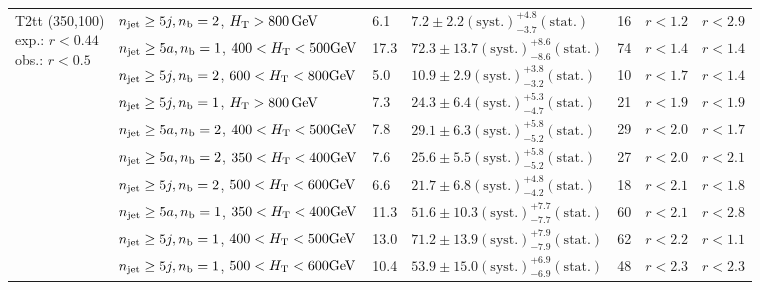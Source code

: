 \begin{table}[h!]
\begin{tabular}{ lllllll }
\multirow{10}{*}{\parbox[t]{2cm}{T2tt (350,100)\\exp.: $r<0.44$\\obs.: $r<0.5$}}
 & $n_{\mathrm{jet}} \geq5j,n_{\text{b}} =2$, $\mbox{$H_\text{T}$} > 800 \, \mathrm{GeV}$ & 6.1 & $7.2 \pm 2.2 \mathrm{(syst.)} ^{+4.8}_{-3.7} \mathrm{(stat.)}$ & 16 & $r < 1.2$ & $r < 2.9$\\ 
 & $n_{\mathrm{jet}} \geq5a,n_{\text{b}} =1$, $400 < \mbox{$H_\text{T}$} < 500 \mathrm{GeV}$ & 17.3 & $72.3 \pm 13.7 \mathrm{(syst.)} ^{+8.6}_{-8.6} \mathrm{(stat.)}$ & 74 & $r < 1.4$ & $r < 1.4$\\ 
 & $n_{\mathrm{jet}} \geq5j,n_{\text{b}} =2$, $600 < \mbox{$H_\text{T}$} < 800 \mathrm{GeV}$ & 5.0 & $10.9 \pm 2.9 \mathrm{(syst.)} ^{+3.8}_{-3.2} \mathrm{(stat.)}$ & 10 & $r < 1.7$ & $r < 1.4$\\ 
 & $n_{\mathrm{jet}} \geq5j,n_{\text{b}} =1$, $\mbox{$H_\text{T}$} > 800 \, \mathrm{GeV}$ & 7.3 & $24.3 \pm 6.4 \mathrm{(syst.)} ^{+5.3}_{-4.7} \mathrm{(stat.)}$ & 21 & $r < 1.9$ & $r < 1.9$\\ 
 & $n_{\mathrm{jet}} \geq5a,n_{\text{b}} =2$, $400 < \mbox{$H_\text{T}$} < 500 \mathrm{GeV}$ & 7.8 & $29.1 \pm 6.3 \mathrm{(syst.)} ^{+5.8}_{-5.2} \mathrm{(stat.)}$ & 29 & $r < 2.0$ & $r < 1.7$\\ 
 & $n_{\mathrm{jet}} \geq5a,n_{\text{b}} =2$, $350 < \mbox{$H_\text{T}$} < 400 \mathrm{GeV}$ & 7.6 & $25.6 \pm 5.5 \mathrm{(syst.)} ^{+5.8}_{-5.2} \mathrm{(stat.)}$ & 27 & $r < 2.0$ & $r < 2.1$\\ 
 & $n_{\mathrm{jet}} \geq5j,n_{\text{b}} =2$, $500 < \mbox{$H_\text{T}$} < 600 \mathrm{GeV}$ & 6.6 & $21.7 \pm 6.8 \mathrm{(syst.)} ^{+4.8}_{-4.2} \mathrm{(stat.)}$ & 18 & $r < 2.1$ & $r < 1.8$\\ 
 & $n_{\mathrm{jet}} \geq5a,n_{\text{b}} =1$, $350 < \mbox{$H_\text{T}$} < 400 \mathrm{GeV}$ & 11.3 & $51.6 \pm 10.3 \mathrm{(syst.)} ^{+7.7}_{-7.7} \mathrm{(stat.)}$ & 60 & $r < 2.1$ & $r < 2.8$\\ 
 & $n_{\mathrm{jet}} \geq5j,n_{\text{b}} =1$, $400 < \mbox{$H_\text{T}$} < 500 \mathrm{GeV}$ & 13.0 & $71.2 \pm 13.9 \mathrm{(syst.)} ^{+7.9}_{-7.9} \mathrm{(stat.)}$ & 62 & $r < 2.2$ & $r < 1.1$\\ 
 & $n_{\mathrm{jet}} \geq5j,n_{\text{b}} =1$, $500 < \mbox{$H_\text{T}$} < 600 \mathrm{GeV}$ & 10.4 & $53.9 \pm 15.0 \mathrm{(syst.)} ^{+6.9}_{-6.9} \mathrm{(stat.)}$ & 48 & $r < 2.3$ & $r < 2.3$\\ \hline
    \hline
  \end{tabular}
\end{table}

